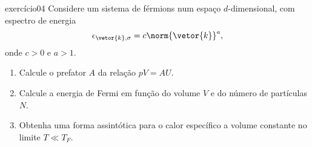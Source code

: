 \begin{exercício}{}{exercício04}
    Considere um sistema de férmions num espaço \(d\)-dimensional, com espectro de energia
    \begin{equation*}
        \epsilon_{\vetor{k}, \sigma} = c \norm{\vetor{k}}^a,
    \end{equation*}
    onde \(c > 0\) e \(a > 1\).
    \begin{enumerate}[label=(\alph*)]
        \item Calcule o prefator \(A\) da relação \(pV = AU\).
        \item Calcule a energia de Fermi em função do volume \(V\) e do número de partículas \(N\).
        \item Obtenha uma forma assintótica para o calor específico a volume constante no limite \(T \ll T_F\).
    \end{enumerate}
\end{exercício}
